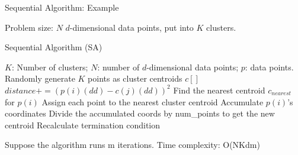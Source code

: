 \documentclass[
nopagebreaks,
style=klope,
fleqn]{powerdot}
\begin{document}
\begin{slide} {Sequential Algorithm: Example}
\begin{figure}[h]
  \end{figure}
  \begin{compactitem}
  \item{Problem size: $N$ $d$-dimensional data points, put into $K$ clusters.}
  \end{compactitem}
\end{slide}

\begin{slide} {Sequential Algorithm (SA)}
  \footnotesize
  \begin{algorithmic}[1]
    \INPUT $K$: Number of clusters; $N$: number of $d$-dimensional data points; $p$: data points. 
    \State Randomly generate $K$ points as cluster centroids $c[]$
    \State $distance += (p(i)(dd) - c(j)(dd))^2$
    \EndFor
    \EndFor
    \State Find the nearest centroid $c_{nearest}$ for $p(i)$
    \State Assign each point to the nearest cluster centroid
    \State Accumulate $p(i)$'s coordinates
    \State Divide the accumulated coords by num\_points to get the new centroid
    \EndFor
    \State Recalculate termination condition
    \EndWhile
    \EndFunction
  \end{algorithmic}
  \begin{compactitem}
    \vspace{.1in}
  \item{Suppose the algorithm runs m iterations. Time complexity: O(NKdm)}
  \end{compactitem}
\end{slide}
\end{document}
